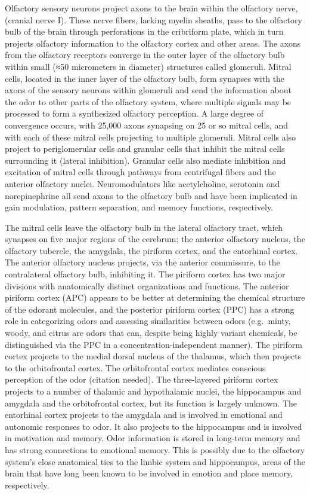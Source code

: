 Olfactory sensory neurons project axons to the brain within the olfactory nerve, (cranial nerve I). These nerve fibers, lacking myelin sheaths, pass to the olfactory bulb of the brain through perforations in the cribriform plate, which in turn projects olfactory information to the olfactory cortex and other areas. The axons from the olfactory receptors converge in the outer layer of the olfactory bulb within small (≈50 micrometers in diameter) structures called glomeruli. Mitral cells, located in the inner layer of the olfactory bulb, form synapses with the axons of the sensory neurons within glomeruli and send the information about the odor to other parts of the olfactory system, where multiple signals may be processed to form a synthesized olfactory perception. A large degree of convergence occurs, with 25,000 axons synapsing on 25 or so mitral cells, and with each of these mitral cells projecting to multiple glomeruli. Mitral cells also project to periglomerular cells and granular cells that inhibit the mitral cells surrounding it (lateral inhibition). Granular cells also mediate inhibition and excitation of mitral cells through pathways from centrifugal fibers and the anterior olfactory nuclei. Neuromodulators like acetylcholine, serotonin and norepinephrine all send axons to the olfactory bulb and have been implicated in gain modulation, pattern separation, and memory functions, respectively.

The mitral cells leave the olfactory bulb in the lateral olfactory tract, which synapses on five major regions of the cerebrum: the anterior olfactory nucleus, the olfactory tubercle, the amygdala, the piriform cortex, and the entorhinal cortex. The anterior olfactory nucleus projects, via the anterior commissure, to the contralateral olfactory bulb, inhibiting it. The piriform cortex has two major divisions with anatomically distinct organizations and functions. The anterior piriform cortex (APC) appears to be better at determining the chemical structure of the odorant molecules, and the posterior piriform cortex (PPC) has a strong role in categorizing odors and assessing similarities between odors (e.g.~minty, woody, and citrus are odors that can, despite being highly variant chemicals, be distinguished via the PPC in a concentration-independent manner). The piriform cortex projects to the medial dorsal nucleus of the thalamus, which then projects to the orbitofrontal cortex. The orbitofrontal cortex mediates conscious perception of the odor (citation needed). The three-layered piriform cortex projects to a number of thalamic and hypothalamic nuclei, the hippocampus and amygdala and the orbitofrontal cortex, but its function is largely unknown. The entorhinal cortex projects to the amygdala and is involved in emotional and autonomic responses to odor. It also projects to the hippocampus and is involved in motivation and memory. Odor information is stored in long-term memory and has strong connections to emotional memory. This is possibly due to the olfactory system's close anatomical ties to the limbic system and hippocampus, areas of the brain that have long been known to be involved in emotion and place memory, respectively.

